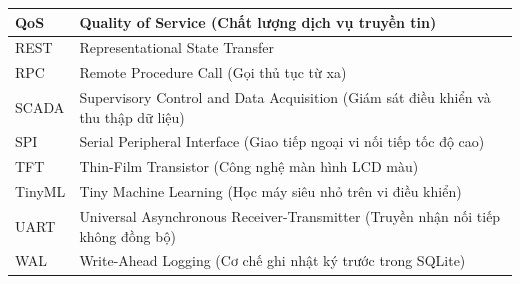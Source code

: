 {\begin{longtable}{|L{0.23\textwidth}|L{0.71\textwidth}|}
  \hline
  QoS    & Quality of Service (Chất lượng dịch vụ truyền tin) \\
  \hline
  REST   & Representational State Transfer \\
  \hline
  RPC    & Remote Procedure Call (Gọi thủ tục từ xa) \\
  \hline
  SCADA  & Supervisory Control and Data Acquisition (Giám sát điều khiển và thu thập dữ liệu) \\
  \hline
  SPI    & Serial Peripheral Interface (Giao tiếp ngoại vi nối tiếp tốc độ cao) \\
  \hline
  TFT    & Thin-Film Transistor (Công nghệ màn hình LCD màu) \\
  \hline
  TinyML & Tiny Machine Learning (Học máy siêu nhỏ trên vi điều khiển) \\
  \hline
  UART   & Universal Asynchronous Receiver-Transmitter (Truyền nhận nối tiếp không đồng bộ) \\
  \hline
  WAL    & Write-Ahead Logging (Cơ chế ghi nhật ký trước trong SQLite) \\
  \hline
\end{longtable}
}
